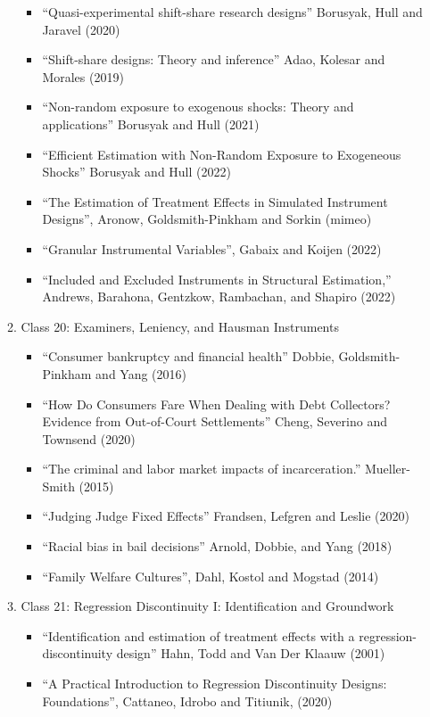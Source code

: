 \documentclass[11pt, a4paper]{article}
\begin{document}
\begin{enumerate}
\begin{enumerate}
\begin{itemize}
    \item ``Quasi-experimental shift-share research designs'' Borusyak, Hull and Jaravel (2020)
    \item ``Shift-share designs: Theory and inference'' Adao, Kolesar and Morales (2019)
    \item ``Non-random exposure to exogenous shocks: Theory and applications'' Borusyak and Hull (2021)
    \item ``Efficient Estimation with Non-Random Exposure to Exogeneous Shocks'' Borusyak and Hull (2022)
    \item ``The Estimation of Treatment Effects in Simulated Instrument Designs'', Aronow, Goldsmith-Pinkham and Sorkin (mimeo)
    \item ``Granular Instrumental Variables'', Gabaix and Koijen (2022)
    \item ``Included and Excluded Instruments in Structural Estimation,'' Andrews, Barahona, Gentzkow, Rambachan, and Shapiro (2022)
    \end{itemize}
  \item Class 20: Examiners, Leniency, and Hausman Instruments
    \begin{itemize}
    \item ``Consumer bankruptcy and financial health'' Dobbie, Goldsmith-Pinkham and Yang (2016)
    \item ``How Do Consumers Fare When Dealing with Debt Collectors? Evidence from Out-of-Court Settlements'' Cheng, Severino and Townsend (2020)
    \item ``The criminal and labor market impacts of incarceration.'' Mueller-Smith (2015)
    \item ``Judging Judge Fixed Effects'' Frandsen, Lefgren and Leslie (2020)
    \item ``Racial bias in bail decisions'' Arnold, Dobbie, and Yang (2018)
    \item ``Family Welfare Cultures'', Dahl, Kostol and Mogstad (2014)
    \end{itemize}
  \item Class 21: Regression Discontinuity I: Identification and Groundwork
    \begin{itemize}
    \item ``Identification and estimation of treatment effects with a regression-discontinuity design'' Hahn, Todd and Van Der Klaauw (2001)
    \item ``A Practical Introduction to Regression Discontinuity Designs: Foundations'', Cattaneo, Idrobo and Titiunik, (2020)

\end{itemize}
\end{enumerate}
\end{enumerate}
\end{document}

